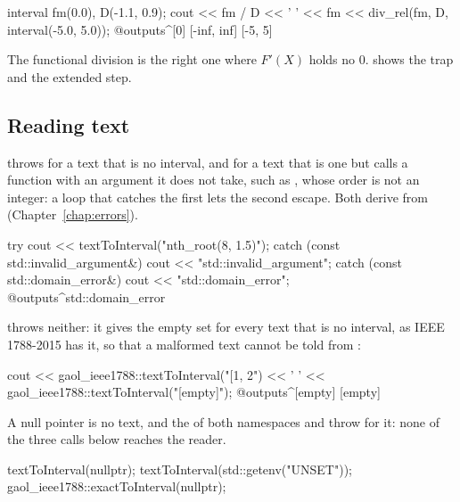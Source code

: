 \documentclass[12pt,a4paper,twoside,openright]{book}
\begin{document}
\begin{example}
interval fm(0.0), D(-1.1, 0.9);
cout << fm / D << ' ' << fm %
     << div_rel(fm, D, interval(-5.0, 5.0));
@outputs^[0] [-inf, inf] [-5, 5]~
\end{example}

\noindent
The functional division is the right one where $F'(X)$ holds no 0.
 shows the trap and the extended step.

\subsection{Reading text}
%

 throws  for a text
that is no interval, and  for a text that is one but
calls a function with an argument it does not take, such as
, whose order is not an integer: a loop that catches
the first lets the second escape. Both derive from 
(Chapter~\ref{chap:errors}).\newinvfive

\begin{example}
try {
  cout << textToInterval("nth_root(8, 1.5)");
} catch (const std::invalid_argument&) {
  cout << "std::invalid_argument";
} catch (const std::domain_error&) {
  cout << "std::domain_error";
}
@outputs^std::domain_error~
\end{example}

\noindent
{} throws neither: it gives the empty set
for every text that is no interval, as IEEE 1788-2015 has it, so that a
malformed text cannot be told from :

\begin{example}
cout << gaol_ieee1788::textToInterval("[1, 2") << ' '
     << gaol_ieee1788::textToInterval("[empty]");
@outputs^[empty] [empty]~
\end{example}

\noindent
A null pointer is no text, and the  of both namespaces
and  throw  for it: none
of the three calls below reaches the reader.

\begin{example}
textToInterval(nullptr);
textToInterval(std::getenv("UNSET"));
gaol_ieee1788::exactToInterval(nullptr);
\end{example}
\end{document}
